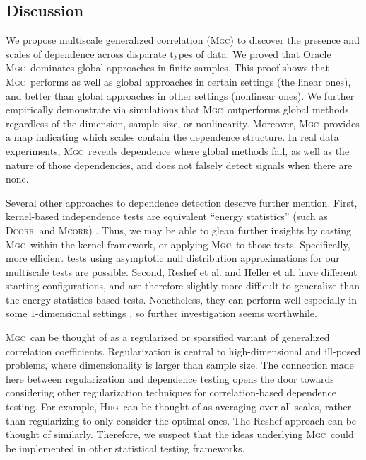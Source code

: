 \documentclass[11pt]{article}
\providecommand{\sct}[1]{{\normalfont\textsc{#1}}}
\newcommand{\Mgc}{\sct{Mgc}}
\newcommand{\Hhg}{\sct{Hhg}}
\newcommand{\Dcorr}{\sct{Dcorr}}
\newcommand{\Mcorr}{\sct{Mcorr}}
\begin{document}
\subsection*{Discussion}
\label{conclu}

We propose multiscale generalized correlation (\Mgc) to discover the presence and scales of dependence across disparate types of data.
We proved that Oracle \Mgc~dominates global approaches in finite samples.  This proof shows that \Mgc~performs as well as global approaches in certain settings (the linear ones), and better than global approaches in other settings (nonlinear ones). 
We further empirically demonstrate via simulations that \Mgc~outperforms global methods regardless of the dimension, sample size, or nonlinearity.  Moreover, \Mgc~provides a map indicating which scales contain the dependence structure. 
In real data experiments, \Mgc~reveals dependence where global methods fail, as well as the nature of those dependencies, and does not falsely detect signals when there are none.

Several other approaches to dependence detection deserve further mention. First, kernel-based independence tests  \cite{GrettonEtAl2005, GrettonGyorfi2010, GrettonEtAl2012} are equivalent ``energy statistics'' (such as \Dcorr~and \Mcorr) \cite{SejdinovicEtAl2013, RamdasEtAl2015}. Thus, we may be able to glean further insights by casting \Mgc~within the kernel framework, or applying \Mgc~to those tests. Specifically, more efficient tests using asymptotic null distribution approximations for our multiscale tests are possible.
Second, Reshef et al. \cite{Reshef2011} and Heller et al. \cite{heller2016consistent} have  different starting configurations, and are therefore slightly more difficult to generalize than the energy statistics based tests.  Nonetheless, they can perform well especially in some $1$-dimensional settings \cite{SimonTibshirani2012, reshef2015empirical}, so further investigation seems worthwhile. 


 \Mgc~can be thought of as a regularized or sparsified variant of generalized correlation coefficients.  Regularization is central to high-dimensional and ill-posed problems, where dimensionality is larger than sample size. The connection made here between regularization and dependence testing opens the door towards considering other regularization techniques for correlation-based dependence testing. For example, \Hhg~can be thought of as averaging over all scales, rather than regularizing to only consider the optimal ones. The Reshef approach can be thought of similarly.  Therefore, we suspect that the ideas underlying \Mgc~could be implemented in other statistical testing frameworks.
\end{document}
